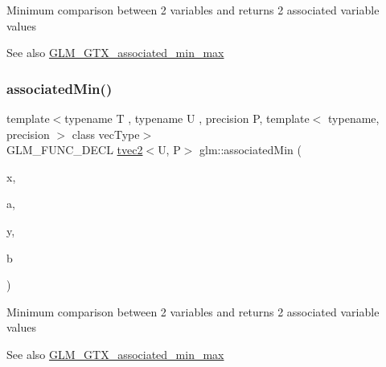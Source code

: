 Minimum comparison between 2 variables and returns 2 associated variable values \begin{DoxySeeAlso}{See also}
\hyperlink{group__gtx__associated__min__max}{G\+L\+M\+\_\+\+G\+T\+X\+\_\+associated\+\_\+min\+\_\+max} 
\end{DoxySeeAlso}
\mbox{\label{group__gtx__associated__min__max_ga8b538d10872626668a078e2bd495af25}} 
\subsubsection{\texorpdfstring{associated\+Min()}{associatedMin()}\hspace{0.1cm}{\footnotesize\ttfamily [2/10]}}
{\footnotesize\ttfamily template$<$typename T , typename U , precision P, template$<$ typename, precision $>$ class vec\+Type$>$ \\
G\+L\+M\+\_\+\+F\+U\+N\+C\+\_\+\+D\+E\+CL \hyperlink{structglm_1_1tvec2}{tvec2}$<$U, P$>$ glm\+::associated\+Min (\begin{DoxyParamCaption}\item[{vec\+Type$<$ T, P $>$ const \&}]{x,  }\item[{vec\+Type$<$ U, P $>$ const \&}]{a,  }\item[{vec\+Type$<$ T, P $>$ const \&}]{y,  }\item[{vec\+Type$<$ U, P $>$ const \&}]{b }\end{DoxyParamCaption})}

Minimum comparison between 2 variables and returns 2 associated variable values \begin{DoxySeeAlso}{See also}
\hyperlink{group__gtx__associated__min__max}{G\+L\+M\+\_\+\+G\+T\+X\+\_\+associated\+\_\+min\+\_\+max} 
\end{DoxySeeAlso}
\mbox{\label{group__gtx__associated__min__max_ga1dccff48fa5650c746533de83467da6e}} 
